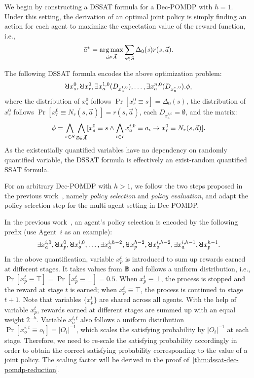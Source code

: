We begin by constructing a DSSAT formula for a Dec-POMDP with $h=1$.
Under this setting,
the derivation of an optimal joint policy is simply finding an action for each agent to maximize the expectation value of the reward function, i.e.,
\begin{align*}
    \vec{a}^*=\operatorname*{arg\,max}_{\vec{a}\in \vec{A}}\sum_{s\in S}\Delta_0(s)r(s,\vec{a}).
\end{align*}

The following DSSAT formula encodes the above optimization problem:
\begin{align*}
    \random{} x_s^0,\random{} x_r^0,\exists x_a^{1,0}(D_{x_a^{1,0}}),\ldots,\exists x_a^{n,0}(D_{x_a^{n,0}}).\pf,
\end{align*}
where the distribution of $x_s^0$ follows $\Pr[x_s^0 \equiv s]=\Delta_0(s)$,
the distribution of $x_r^0$ follows $\Pr[x_r^0 \equiv N_r(s,\vec{a})]=r(s,\vec{a})$,
each $D_{x_a^{i,0}}=\emptyset$, and the matrix:
\begin{align*}
    \phi=\bigwedge_{s\in S}\bigwedge_{\vec{a}\in\vec{A}}[x_s^0\equiv s\wedge\bigwedge_{i\in I} x_a^{i,0}\equiv a_i\rightarrow x_r^0\equiv N_r(s,\vec{a})].
\end{align*}
As the existentially quantified variables have no dependency on randomly quantified variable,
the DSSAT formula is effectively an exist-random quantified SSAT formula.

For an arbitrary Dec-POMDP with $h>1$,
we follow the two steps proposed in the previous work~\cite{Salmon2020},
namely \textit{policy selection} and \textit{policy evaluation},
and adapt the policy selection step for the multi-agent setting in Dec-POMDP.

In the previous work~\cite{Salmon2020},
an agent's policy selection is encoded by the following prefix (use Agent~$i$ as an example):
\begin{align*}
    \exists x_a^{i,0},\random{} x_p^0,\random{} x_o^{i,0},\ldots,\exists x_a^{i,h-2},\random{} x_p^{h-2},\random{} x_o^{i,h-2},\exists x_a^{i,h-1},\random{} x_p^{h-1}.
\end{align*}
In the above quantification,
variable $x_p^t$ is introduced to sum up rewards earned at different stages.
It takes values from $\mathbb{B}$ and follows a uniform distribution,
i.e., $\Pr[x_p^t\equiv\top]=\Pr[x_p^t\equiv\bot]=0.5$.
When $x_p^t\equiv\bot$,
the process is stopped and the reward at stage $t$ is earned;
when $x_p^t\equiv\top$,
the process is continued to stage $t+1$.
Note that variables $\{x_p^t\}$ are shared across all agents.
With the help of variable $x_p^t$,
rewards earned at different stages are summed up with an equal weight $2^{-h}$.
Variable $x_o^{i,t}$ also follows a uniform distribution $\Pr[x_o^{i,t} \equiv o_i]=|O_i|^{-1}$,
which scales the satisfying probability by $|O_i|^{-1}$ at each stage.
Therefore, we need to re-scale the satisfying probability accordingly in order to obtain the correct satisfying probability corresponding to the value of a joint policy.
The scaling factor will be derived in the proof of~\cref{thm:dssat-dec-pomdp-reduction}.

